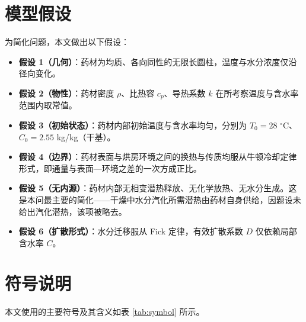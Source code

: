 \documentclass[12pt,a4paper]{ctexart}
\begin{document}
\section{模型假设}
为简化问题，本文做出以下假设：
\begin{itemize}
\item \textbf{假设 1（几何）}：药材为均质、各向同性的无限长圆柱，温度与水分浓度仅沿径向变化。
\item \textbf{假设 2（物性）}：药材密度 $\rho$、比热容 $c_p$、导热系数 $k$ 在所考察温度与含水率范围内取常值。
\item \textbf{假设 3（初始状态）}：药材内部初始温度与含水率均匀，分别为 $T_0=28$ $^\circ$C、$C_0=2.55$ kg/kg（干基）。
\item \textbf{假设 4（边界）}：药材表面与烘房环境之间的换热与传质均服从牛顿冷却定律形式，即通量与表面—环境之差的一次方成正比。
\item \textbf{假设 5（无内源）}：药材内部无相变潜热释放、无化学放热、无水分生成。这是本问最主要的简化——干燥中水分汽化所需潜热由药材自身供给，因题设未给出汽化潜热，该项被略去。
\item \textbf{假设 6（扩散形式）}：水分迁移服从 Fick 定律，有效扩散系数 $D$ 仅依赖局部含水率 $C$。
\end{itemize}

\section{符号说明}
本文使用的主要符号及其含义如表 \ref{tab:symbol} 所示。
\end{document}
